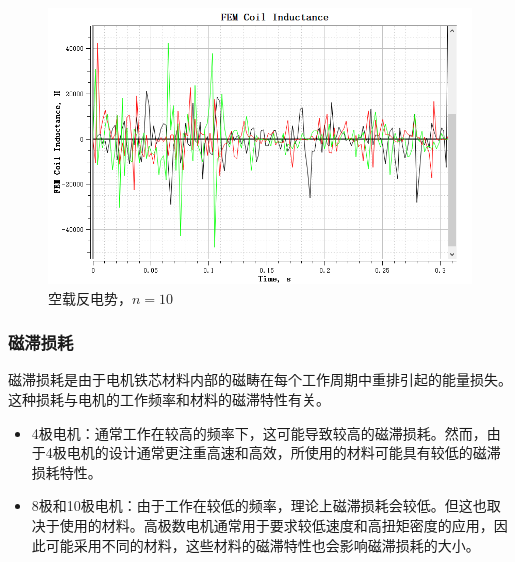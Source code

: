 \documentclass{thuemp}
\begin{document}
\begin{figure}[H]
  \centering
  \includegraphics[width=1\linewidth]{./img/task3/FEM-n10.png}
  \caption{空载反电势，$n=10$}
\end{figure}

\subsubsection{磁滞损耗}
磁滞损耗是由于电机铁芯材料内部的磁畴在每个工作周期中重排引起的能量损失。
这种损耗与电机的工作频率和材料的磁滞特性有关。
\begin{itemize}
	\item 4极电机：通常工作在较高的频率下，这可能导致较高的磁滞损耗。然而，由于4极电机的设计通常更注重高速和高效，所使用的材料可能具有较低的磁滞损耗特性。
	\item 8极和10极电机：由于工作在较低的频率，理论上磁滞损耗会较低。但这也取决于使用的材料。高极数电机通常用于要求较低速度和高扭矩密度的应用，因此可能采用不同的材料，这些材料的磁滞特性也会影响磁滞损耗的大小。
\end{itemize}
\end{document}
